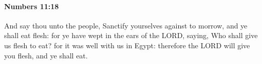 
		\paragraph{Numbers 11:18} %
			\label{NUMBERS-11-18}

			And say thou unto the people, Sanctify yourselves against to morrow, and ye shall eat flesh: for ye have wept in the ears of the LORD, saying, Who shall give us flesh to eat? for it was well with us in Egypt: therefore the LORD will give you flesh, and ye shall eat.


